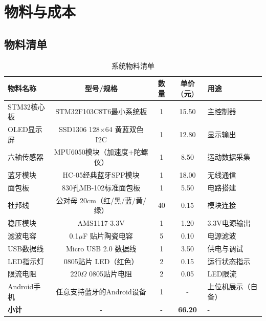 \section{物料与成本}

\subsection{物料清单}
\begin{table}[h]
    \centering
    \caption{系统物料清单}
    \begin{tabular}{|l|c|c|c|l|}
        \hline
        \textbf{物料名称} & \textbf{型号/规格} & \textbf{数量} & \textbf{单价(元)} & \textbf{用途} \\ \hline
        STM32核心板 & STM32F103C8T6最小系统板 & 1 & 15.50 & 主控制器 \\ \hline
        OLED显示屏 & SSD1306 128$\times$64 黄蓝双色 I2C & 1 & 12.80 & 显示输出 \\ \hline
        六轴传感器 & MPU6050模块（加速度+陀螺仪） & 1 & 8.50 & 运动数据采集 \\ \hline
        蓝牙模块 & HC-05经典蓝牙SPP模块 & 1 & 18.00 & 无线通信 \\ \hline
        面包板 & 830孔MB-102标准面包板 & 1 & 5.50 & 电路搭建 \\ \hline
        杜邦线 & 公对母 20cm（红/黑/蓝/黄/绿） & 40 & 0.15 & 模块连接 \\ \hline
        稳压模块 & AMS1117-3.3V & 1 & 1.20 & 3.3V电源输出 \\ \hline
        滤波电容 & 0.1$\mu$F 贴片陶瓷电容 & 5 & 0.10 & 电源滤波 \\ \hline
        USB数据线 & Micro USB 2.0 数据线 & 1 & 3.50 & 供电与调试 \\ \hline
        LED指示灯 & 0805贴片 LED（红色） & 2 & 0.15 & 运行状态指示 \\ \hline
        限流电阻 & 220$\Omega$ 0805贴片电阻 & 2 & 0.05 & LED限流 \\ \hline
        Android手机 & 任意支持蓝牙的Android设备 & 1 & - & 上位机展示（自备） \\ \hline
        \textbf{小计} & - & - & \textbf{66.20} & - \\ \hline
    \end{tabular}
\end{table}

